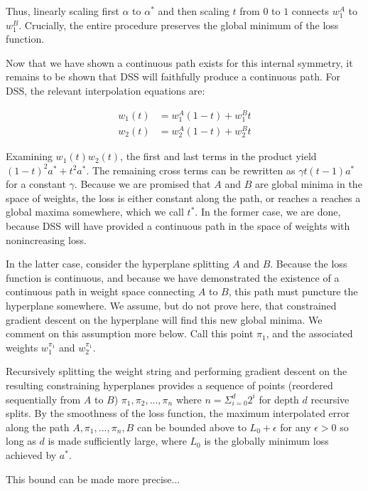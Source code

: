 \documentclass[twocolumn,superscriptaddress,aps,prb,floatfix]{revtex4-1}
\begin{document}
  Thus, linearly scaling first $\alpha$ to $\alpha^*$ and then scaling $t$ from $0$ to $1$ connects $w_1^A$ to $w_1^B$.  Crucially, the entire procedure preserves the global minimum of the loss function.  
  
  Now that we have shown a continuous path exists for this internal symmetry, it remains to be shown that DSS will faithfully produce a continuous path.  For DSS, the relevant interpolation equations are:
  
  \begin{align}
  w_1(t) &= w_1^A (1-t) + w_1^B t \\
  w_2(t) &= w_2^A (1-t) + w_2^B t
  \end{align}
  
  Examining $w_1(t) w_2(t)$, the first and last terms in the product yield $(1-t)^2 a^* + t^2 a^*$.  The remaining cross terms can be rewritten as $\gamma t(t-1) a^*$ for a constant $\gamma$.  Because we are promised that $A$ and $B$ are global minima in the space of weights, the loss is either constant along the path, or reaches a reaches a global maxima somewhere, which we call $t^*$.  In the former case, we are done, because DSS will have provided a continuous path in the space of weights with nonincreasing loss.
 
  In the latter case, consider the hyperplane splitting $A$ and $B$.  Because the loss function is continuous, and because we have demonstrated the existence of a continuous path in weight space connecting $A$ to $B$, this path must puncture the hyperplane somewhere.  We assume, but do not prove here, that constrained gradient descent on the hyperplane will find this new global minima.  We comment on this assumption more below.  Call this point $\pi_1$, and the associated weights $w^{\pi_1}_1$ and $w^{\pi_1}_2$.
  
  Recursively splitting the weight string and performing gradient descent on the resulting constraining hyperplanes provides a sequence of points (reordered sequentially from $A$ to $B$) ${\pi_1, \pi_2, ..., \pi_n}$ where $n = \Sigma_{i=0}^{d} 2^i$ for depth $d$ recursive splits.  By the smoothness of the loss function, the maximum interpolated error along the path $A, \pi_1, ..., \pi_n, B$ can be bounded above to $L_0 + \epsilon$ for any $\epsilon > 0$ so long as $d$ is made sufficiently large, where $L_0$ is the globally minimum loss achieved by $a^*$.
  
  This bound can be made more precise...
  
  
  
\end{document}
